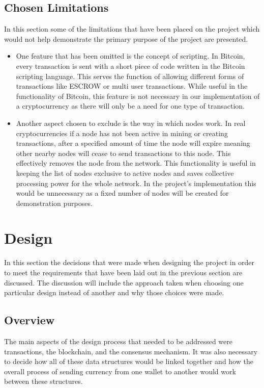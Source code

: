 \documentclass{l4proj}
\begin{document}
\section{Chosen Limitations}
In this section some of the limitations that have been placed on the project which would not help demonstrate the 
primary purpose of the project are presented.
\begin{itemize}
    \item One feature that has been omitted is the concept of scripting. In Bitcoin, every transaction is sent
        with a short piece of code written in the Bitcoin scripting language. This serves the function of allowing 
        different forms of transactions like ESCROW or multi user transactions. While useful in the functionality of
        Bitcoin, this feature is not necessary in our implementation of a cryptocurrency as there will only be a need
        for one type of transaction.
    \item Another aspect chosen to exclude is the way in which nodes work. In real cryptocurrencies if a node
        has not been active in mining or creating transactions, after a specified amount of time the node will expire
        meaning other nearby nodes will cease to send transactions to this node. This effectively removes the node from
        the network. This functionality is useful in keeping the list of nodes exclusive to active nodes and saves
        collective processing power for the whole network. In the project's implementation this would be unnecessary as a fixed
        number of nodes will be created for demonstration purposes.
\end{itemize}

\chapter{Design}
In this section the decisions that were made when designing the project in order to meet the requirements
that have been laid out in the previous section are discussed. The discussion will include the approach taken when
choosing one particular design instead of another and why those choices were made.

\section{Overview}
The main aspects of the design process that needed to be addressed were transactions, the blockchain, and
the consensus mechanism. It was also necessary to decide how all of these data structures would be linked together and
how the overall process of sending currency from one wallet to another would work between these structures.
\end{document}
